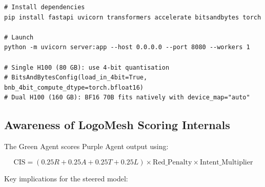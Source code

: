 \documentclass[11pt, a4paper]{article}
\begin{document}
\begin{codebox}
\begin{lstlisting}[style=bash]
# Install dependencies
pip install fastapi uvicorn transformers accelerate bitsandbytes torch

# Launch
python -m uvicorn server:app --host 0.0.0.0 --port 8080 --workers 1

# Single H100 (80 GB): use 4-bit quantisation
# BitsAndBytesConfig(load_in_4bit=True, bnb_4bit_compute_dtype=torch.bfloat16)
# Dual H100 (160 GB): BF16 70B fits natively with device_map="auto"
\end{lstlisting}
\end{codebox}

\subsection{Awareness of LogoMesh Scoring Internals}

The Green Agent scores Purple Agent output using:

\[
  \text{CIS} = (0.25R + 0.25A + 0.25T + 0.25L) \times \text{Red\_Penalty}
               \times \text{Intent\_Multiplier}
\]

Key implications for the steered model:
\end{document}

